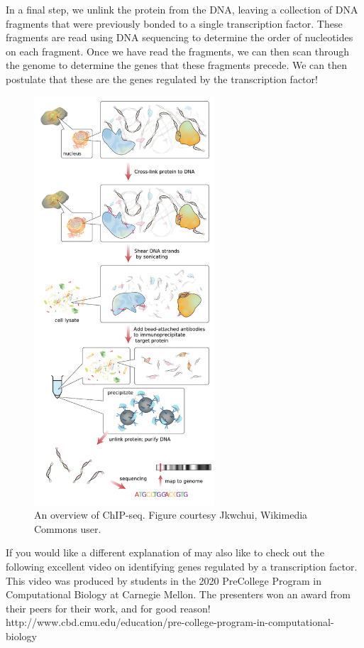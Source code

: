 In a final step, we unlink the protein from the DNA, leaving a collection of DNA fragments that were previously bonded to a single transcription factor. These fragments are read using DNA sequencing to determine the order of nucleotides on each fragment. Once we have read the fragments, we can then scan through the genome to determine the genes that these fragments precede. We can then postulate that these are the genes regulated by the transcription factor!

\begin{figure}[h]
\centering
\mySfFamily
\includegraphics[width = 0.6\textwidth]{../assets/images/600px/ChIP-seq_workflow.png}
\caption{An overview of ChIP-seq. Figure courtesy Jkwchui, Wikimedia Commons user.}
\label{fig:ChIP-seq_workflow}
\end{figure}

If you would like a different explanation of  may also like to check out the following excellent video on identifying genes regulated by a transcription factor. This video was produced by students in the 2020 PreCollege Program in Computational Biology at Carnegie Mellon. The presenters won an award from their peers for their work, and for good reason! http://www.cbd.cmu.edu/education/pre-college-program-in-computational-biology

